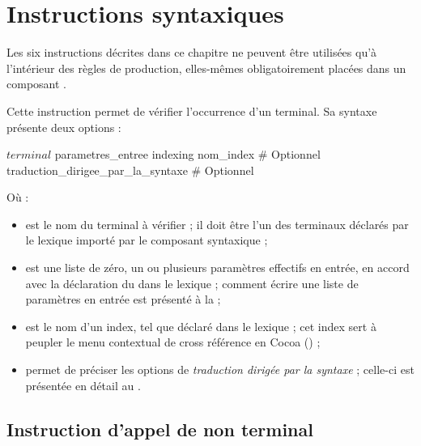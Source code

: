 
\chapter{Instructions syntaxiques}

Les six instructions décrites dans ce chapitre ne peuvent être utilisées qu'à l'intérieur des règles de production, elles-mêmes obligatoirement placées dans un composant .




Cette instruction permet de vérifier l'occurrence d'un terminal. Sa syntaxe présente deux options :
\begin{galgascode}
$terminal$ parametres_entree
indexing nom_index # Optionnel
traduction_dirigee_par_la_syntaxe # Optionnel
\end{galgascode}

Où :
\begin{itemize}
  \item {} est le nom du terminal à vérifier ; il doit être l'un des terminaux déclarés par le lexique importé par le composant syntaxique ;
  \item {} est une liste de zéro, un ou plusieurs paramètres effectifs en entrée, en accord avec la déclaration du  dans le lexique ; comment écrire une liste de paramètres en entrée est présenté à la  ;
  \item {} est le nom d'un index, tel que déclaré dans le lexique ; cet index sert à peupler le menu contextual de cross référence en Cocoa () ;
  \item {} permet de préciser les options de \emph{traduction dirigée par la syntaxe} ; celle-ci est présentée en détail au . 
\end{itemize}






\section{Instruction d'appel de non terminal}






